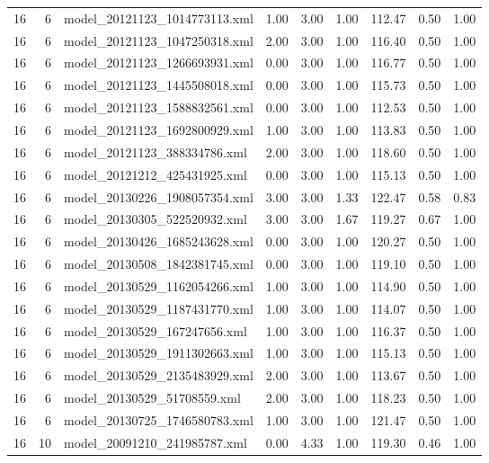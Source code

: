 \begin{table}[ht]
\begin{tabular}{rrlrrrrrr}
   16 &   6 & model\_20121123\_1014773113.xml & 1.00 & 3.00 & 1.00 & 112.47 & 0.50 & 1.00 \\ 
   16 &   6 & model\_20121123\_1047250318.xml & 2.00 & 3.00 & 1.00 & 116.40 & 0.50 & 1.00 \\ 
   16 &   6 & model\_20121123\_1266693931.xml & 0.00 & 3.00 & 1.00 & 116.77 & 0.50 & 1.00 \\ 
   16 &   6 & model\_20121123\_1445508018.xml & 0.00 & 3.00 & 1.00 & 115.73 & 0.50 & 1.00 \\ 
   16 &   6 & model\_20121123\_1588832561.xml & 0.00 & 3.00 & 1.00 & 112.53 & 0.50 & 1.00 \\ 
   16 &   6 & model\_20121123\_1692800929.xml & 1.00 & 3.00 & 1.00 & 113.83 & 0.50 & 1.00 \\ 
   16 &   6 & model\_20121123\_388334786.xml & 2.00 & 3.00 & 1.00 & 118.60 & 0.50 & 1.00 \\ 
   16 &   6 & model\_20121212\_425431925.xml & 0.00 & 3.00 & 1.00 & 115.13 & 0.50 & 1.00 \\ 
   16 &   6 & model\_20130226\_1908057354.xml & 3.00 & 3.00 & 1.33 & 122.47 & 0.58 & 0.83 \\ 
   16 &   6 & model\_20130305\_522520932.xml & 3.00 & 3.00 & 1.67 & 119.27 & 0.67 & 1.00 \\ 
   16 &   6 & model\_20130426\_1685243628.xml & 0.00 & 3.00 & 1.00 & 120.27 & 0.50 & 1.00 \\ 
   16 &   6 & model\_20130508\_1842381745.xml & 0.00 & 3.00 & 1.00 & 119.10 & 0.50 & 1.00 \\ 
   16 &   6 & model\_20130529\_1162054266.xml & 1.00 & 3.00 & 1.00 & 114.90 & 0.50 & 1.00 \\ 
   16 &   6 & model\_20130529\_1187431770.xml & 1.00 & 3.00 & 1.00 & 114.07 & 0.50 & 1.00 \\ 
   16 &   6 & model\_20130529\_167247656.xml & 1.00 & 3.00 & 1.00 & 116.37 & 0.50 & 1.00 \\ 
   16 &   6 & model\_20130529\_1911302663.xml & 1.00 & 3.00 & 1.00 & 115.13 & 0.50 & 1.00 \\ 
   16 &   6 & model\_20130529\_2135483929.xml & 2.00 & 3.00 & 1.00 & 113.67 & 0.50 & 1.00 \\ 
   16 &   6 & model\_20130529\_51708559.xml & 2.00 & 3.00 & 1.00 & 118.23 & 0.50 & 1.00 \\ 
   16 &   6 & model\_20130725\_1746580783.xml & 1.00 & 3.00 & 1.00 & 121.47 & 0.50 & 1.00 \\ 
   16 &  10 & model\_20091210\_241985787.xml & 0.00 & 4.33 & 1.00 & 119.30 & 0.46 & 1.00 \\ 

\end{tabular}
\end{table}
